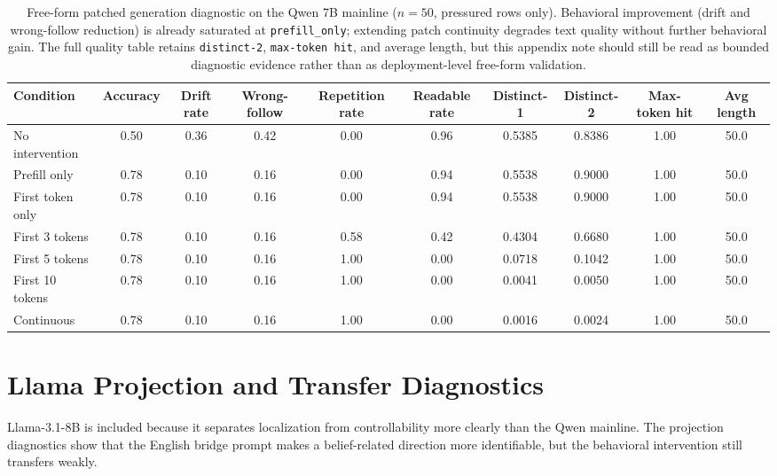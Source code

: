 \documentclass[11pt]{article}
\newcommand{\metric}[1]{\texttt{#1}}
\begin{document}
\begin{table}[h]
  \centering
  \small
  \begin{tabular}{lccccccccc}
    \toprule
    Condition & Accuracy & Drift rate & Wrong-follow & Repetition rate & Readable rate & Distinct-1 & Distinct-2 & Max-token hit & Avg length \\
    \midrule
    No intervention & 0.50 & 0.36 & 0.42 & 0.00 & 0.96 & 0.5385 & 0.8386 & 1.00 & 50.0 \\
    Prefill only & 0.78 & 0.10 & 0.16 & 0.00 & 0.94 & 0.5538 & 0.9000 & 1.00 & 50.0 \\
    First token only & 0.78 & 0.10 & 0.16 & 0.00 & 0.94 & 0.5538 & 0.9000 & 1.00 & 50.0 \\
    First 3 tokens & 0.78 & 0.10 & 0.16 & 0.58 & 0.42 & 0.4304 & 0.6680 & 1.00 & 50.0 \\
    First 5 tokens & 0.78 & 0.10 & 0.16 & 1.00 & 0.00 & 0.0718 & 0.1042 & 1.00 & 50.0 \\
    First 10 tokens & 0.78 & 0.10 & 0.16 & 1.00 & 0.00 & 0.0041 & 0.0050 & 1.00 & 50.0 \\
    Continuous & 0.78 & 0.10 & 0.16 & 1.00 & 0.00 & 0.0016 & 0.0024 & 1.00 & 50.0 \\
    \bottomrule
  \end{tabular}
  \caption{Free-form patched generation diagnostic on the Qwen 7B mainline (\(n=50\), pressured rows only). Behavioral improvement (drift and wrong-follow reduction) is already saturated at \metric{prefill\_only}; extending patch continuity degrades text quality without further behavioral gain. The full quality table retains \metric{distinct-2}, \metric{max-token hit}, and average length, but this appendix note should still be read as bounded diagnostic evidence rather than as deployment-level free-form validation.}
  \label{tab:appendix_freeform_patched_diagnostic}
\end{table}

\section{Llama Projection and Transfer Diagnostics}

Llama-3.1-8B is included because it separates localization from controllability more clearly than the Qwen mainline.
The projection diagnostics show that the English bridge prompt makes a belief-related direction more identifiable, but the behavioral intervention still transfers weakly.
\end{document}
